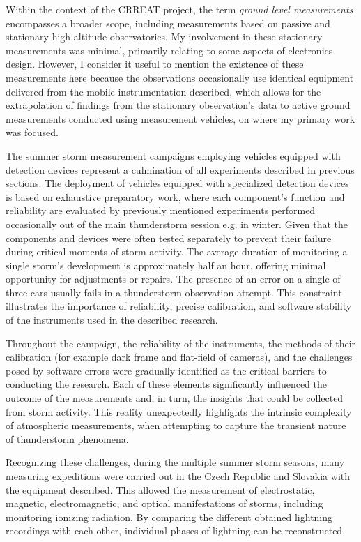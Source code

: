 Within the context of the CRREAT project, the term {\em ground level measurements} encompasses a broader scope, including measurements based on passive and stationary high-altitude observatories. My involvement in these stationary measurements was minimal, primarily relating to some aspects of electronics design. However, I consider it useful to mention the existence of these measurements here because the observations occasionally use identical equipment delivered from the mobile instrumentation described, which allows for the extrapolation of findings from the stationary observation’s data to active ground measurements conducted using measurement vehicles, on where my primary work was focused.

The summer storm measurement campaigns employing vehicles equipped with detection devices represent a culmination of all experiments described in previous sections. The deployment of vehicles equipped with specialized detection devices is based on exhaustive preparatory work, where each component's function and reliability are evaluated by previously mentioned experiments performed occasionally out of the main thunderstorm session e.g. in winter.  Given that the components and devices were often tested separately to prevent their failure during critical moments of storm activity.
The average duration of monitoring a single storm's development is approximately half an hour, offering minimal opportunity for adjustments or repairs. The presence of an error on a single of three cars usually fails in a thunderstorm observation attempt. This constraint illustrates the importance of reliability, precise calibration, and software stability of the instruments used in the described research.

Throughout the campaign, the reliability of the instruments, the methods of their calibration (for example dark frame and flat-field of cameras), and the challenges posed by software errors were gradually identified as the critical barriers to conducting the research. Each of these elements significantly influenced the outcome of the measurements and, in turn, the insights that could be collected from storm activity. This reality unexpectedly highlights the intrinsic complexity of atmospheric measurements, when attempting to capture the transient nature of thunderstorm phenomena.

Recognizing these challenges, during the multiple summer storm seasons, many measuring expeditions were carried out in the Czech Republic and Slovakia with the equipment described. This allowed the measurement of electrostatic, magnetic, electromagnetic, and optical manifestations of storms, including monitoring ionizing radiation. By comparing the different obtained lightning recordings with each other, individual phases of lightning can be reconstructed.

